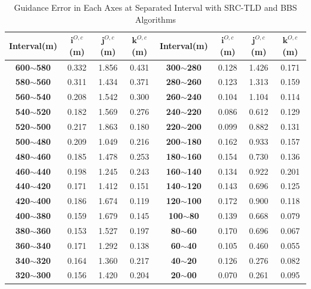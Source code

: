 \begin{table}[!th]
	\centering
	\caption{Guidance Error in Each Axes at Separated Interval with SRC-TLD and BBS Algorithms}
	\label{lab:ground_landing}
	\begin{tabular}{cccc|cccc}
		\hline
		\textbf{Interval(m)} & \textbf{$\mathbf{i}^{O,c}$(m)} & \textbf{$\mathbf{j}^{O,c}$(m)} & \textbf{$\mathbf{k}^{O,c}$(m)} & \textbf{Interval(m)} & \textbf{$\mathbf{i}^{O,c}$(m)} & \textbf{$\mathbf{j}^{O,c}$(m)} & \textbf{$\mathbf{k}^{O,c}$(m)} \\ \hline
		\textbf{600$\sim$580} & 0.332 & 1.856 & 0.431 & \textbf{300$\sim$280} & 0.128 & 1.426 & 0.171 \\
		\textbf{580$\sim$560} & 0.311 & 1.434 & 0.371 & \textbf{280$\sim$260} & 0.123 & 1.313 & 0.159 \\
		\textbf{560$\sim$540} & 0.208 & 1.542 & 0.300 & \textbf{260$\sim$240} & 0.104 & 1.104 & 0.114 \\
		\textbf{540$\sim$520} & 0.182 & 1.569 & 0.276 & \textbf{240$\sim$220} & 0.086 & 0.612 & 0.129 \\
		\textbf{520$\sim$500} & 0.217 & 1.863 & 0.180 & \textbf{220$\sim$200} & 0.099 & 0.882 & 0.131 \\
		\textbf{500$\sim$480} & 0.209 & 1.049 & 0.216 & \textbf{200$\sim$180} & 0.162 & 0.933 & 0.157 \\
		\textbf{480$\sim$460} & 0.185 & 1.478 & 0.253 & \textbf{180$\sim$160} & 0.154 & 0.730 & 0.136 \\
		\textbf{460$\sim$440} & 0.198 & 1.245 & 0.243 & \textbf{160$\sim$140} & 0.134 & 0.922 & 0.201 \\
		\textbf{440$\sim$420} & 0.171 & 1.412 & 0.151 & \textbf{140$\sim$120} & 0.143 & 0.696 & 0.125 \\
		\textbf{420$\sim$400} & 0.186 & 1.674 & 0.119 & \textbf{120$\sim$100} & 0.172 & 0.900 & 0.118 \\
		\textbf{400$\sim$380} & 0.159 & 1.679 & 0.145 & \textbf{100$\sim$80} & 0.139 & 0.668 & 0.079 \\
		\textbf{380$\sim$360} & 0.153 & 1.527 & 0.197 & \textbf{80$\sim$60} & 0.170 & 0.696 & 0.067 \\
		\textbf{360$\sim$340} & 0.171 & 1.292 & 0.138 & \textbf{60$\sim$40} & 0.105 & 0.460 & 0.055 \\
		\textbf{340$\sim$320} & 0.164 & 1.360 & 0.217 & \textbf{40$\sim$20} & 0.126 & 0.276 & 0.082 \\
		\textbf{320$\sim$300} & 0.156 & 1.420 & 0.204 & \textbf{20$\sim$00} & 0.070 & 0.261 & 0.095 \\ \hline
	\end{tabular}
\end{table}

